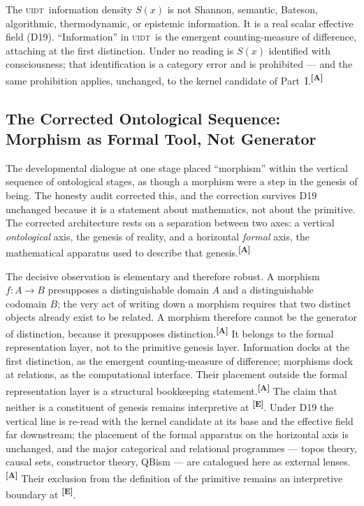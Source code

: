 \documentclass[12pt,a4paper,twoside]{article}
\theoremstyle{plain}
\theoremstyle{definition}
\theoremstyle{remark}
\newcommand{\UIDT}{\textsc{uidt}} %
\newcommand{\catmark}[1]{\textsuperscript{\textsf{\textbf{[#1]}}}}
\begin{document}
\begin{governancebox}
The \UIDT\ information density $S(x)$ is not Shannon, semantic, Bateson,
algorithmic, thermodynamic, or epistemic information. It is a real
scalar effective field (D19). ``Information'' in \UIDT\ is the emergent
counting-measure of difference, attaching at the first distinction.
Under no reading is $S(x)$ identified with consciousness; that
identification is a category error and is prohibited --- and the same
prohibition applies, unchanged, to the kernel candidate of
Part~I.\catmark{A}
\end{governancebox}

\subsection{The Corrected Ontological Sequence: Morphism as Formal Tool, Not Generator}
\label{subsec:corrected-sequence}

The developmental dialogue at one stage placed ``morphism'' within the
vertical sequence of ontological stages, as though a morphism were a
step in the genesis of being. The honesty audit corrected this, and the
correction survives D19 unchanged because it is a statement about
mathematics, not about the primitive. The corrected architecture rests
on a separation between two axes: a vertical \emph{ontological} axis,
the genesis of reality, and a horizontal \emph{formal} axis, the
mathematical apparatus used to describe that genesis.\catmark{A}

The decisive observation is elementary and therefore robust. A morphism
$f\colon A\to B$ presupposes a distinguishable domain $A$ and a
distinguishable codomain $B$; the very act of writing down a morphism
requires that two distinct objects already exist to be related. A
morphism therefore cannot be the generator of distinction, because it
presupposes distinction.\catmark{A} It belongs to the formal
representation layer, not to the primitive genesis layer. Information
docks at the first distinction, as the emergent counting-measure of
difference; morphisms dock at relations, as the computational interface.
Their placement outside the formal representation layer is a structural
bookkeeping statement.\catmark{A} The claim that neither is a constituent
of genesis remains interpretive at \catmark{E}. Under D19 the
vertical line is re-read with the kernel candidate at its base and the
effective field far downstream; the placement of the formal apparatus on
the horizontal axis is unchanged, and the major categorical and
relational programmes --- topos theory, causal sets, constructor theory,
QBism --- are catalogued here as external lenses.\catmark{A} Their exclusion
from the definition of the primitive remains an interpretive boundary at
\catmark{E}.
\end{document}
